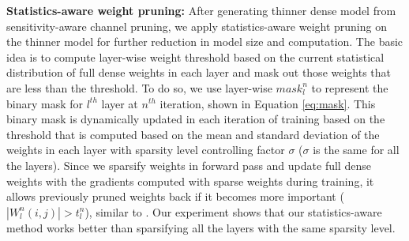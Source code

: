 \documentclass{article}
\begin{document}
\textbf{Statistics-aware weight pruning:} %
After generating thinner dense model from sensitivity-aware channel pruning, we apply statistics-aware weight pruning on the thinner model for further reduction in model size and computation. The basic idea is to compute layer-wise weight threshold based on the current statistical distribution of full dense weights in each layer and mask out those weights that are less than the threshold. To do so, we use layer-wise $mask_{l}^{n}$ to represent the binary mask for $l^{th}$ layer at $n^{th}$ iteration, shown in Equation \ref{eq:mask}. This binary mask is dynamically updated in each iteration of training based on the threshold that is computed based on the mean and standard deviation of the weights in each layer with sparsity level controlling factor $\sigma$ ($\sigma$ is the same for all the layers). Since we sparsify weights in forward pass and update full dense weights with the gradients computed with sparse weights during training, it allows previously pruned weights back if it becomes more important ($ |W_{l}^{n}(i,j)| > t_{l}^{n}$), similar to \cite{guo2016dynamic}. Our experiment shows that our statistics-aware method works better than sparsifying all the layers with the same sparsity level.





\end{document}
